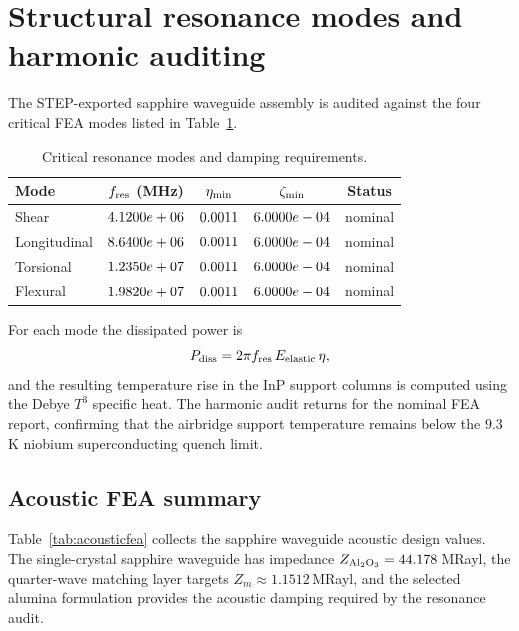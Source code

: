 \documentclass[aps,pra,10pt,onecolumn,superscriptaddress,nofootinbib,longbibliography,floatfix]{revtex4-2}
\begin{document}
\section{Structural resonance modes and harmonic auditing}

The STEP-exported sapphire waveguide assembly is audited against the four critical FEA modes listed in Table~\ref{tab:resonance}.

\begin{table}[!ht]
\caption{Critical resonance modes and damping requirements.}
\label{tab:resonance}
\begin{tabular}{lcccc}
\hline\hline
Mode & $f_{\rm res}$ (MHz) & $\eta_{\rm min}$ & $\zeta_{\rm min}$ & Status \\
\hline
Shear & $4.1200e+06$ & $0.0011$ & $6.0000e-04$ & nominal \\
Longitudinal & $8.6400e+06$ & $0.0011$ & $6.0000e-04$ & nominal \\
Torsional & $1.2350e+07$ & $0.0011$ & $6.0000e-04$ & nominal \\
Flexural & $1.9820e+07$ & $0.0011$ & $6.0000e-04$ & nominal \\
\hline\hline
\end{tabular}
\end{table}

For each mode the dissipated power is
%
\begin{equation}
P_{\rm diss} = 2\pi f_{\rm res}\,E_{\rm elastic}\,\eta,
\end{equation}
%
and the resulting temperature rise in the InP support columns is computed using the Debye $T^3$ specific heat.  The harmonic audit returns \ExoticHarmonicStatus{} for the nominal FEA report, confirming that the airbridge support temperature remains below the $9.3\,$K niobium superconducting quench limit.

\subsection{Acoustic FEA summary}

Table~\ref{tab:acousticfea} collects the sapphire waveguide acoustic design values.  The single-crystal sapphire waveguide has impedance $Z_{\rm Al_2O_3}=44.178\,$MRayl, the quarter-wave matching layer targets $Z_m\approx1.1512\,$MRayl, and the selected alumina formulation provides the acoustic damping required by the resonance audit.
\end{document}
